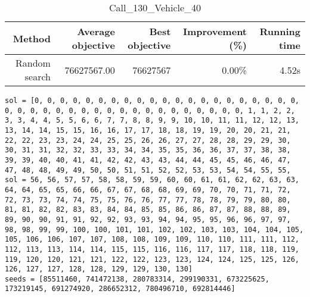 \begin{table}[ht]
\centering
\caption{Call\_130\_Vehicle\_40}
\label{tab:call130vehicle40}
\begin{tabular}{|r|r|r|r|r|}
Method & Average objective & Best objective & Improvement (\%) & Running time \\
\hline
Random search & 76627567.00 & 76627567 & 0.00\% & 4.52s\\
\end{tabular}
\end{table}
\begin{lstlisting}[label={lst:call130vehicle40},caption=Optimal solution call\_130\_vehicle\_40]
sol = [0, 0, 0, 0, 0, 0, 0, 0, 0, 0, 0, 0, 0, 0, 0, 0, 0, 0, 0, 0, 0, 0, 0, 0, 0, 0, 0, 0, 0, 0, 0, 0, 0, 0, 0, 0, 0, 0, 0, 0, 1, 1, 2, 2, 3, 3, 4, 4, 5, 5, 6, 6, 7, 7, 8, 8, 9, 9, 10, 10, 11, 11, 12, 12, 13, 13, 14, 14, 15, 15, 16, 16, 17, 17, 18, 18, 19, 19, 20, 20, 21, 21, 22, 22, 23, 23, 24, 24, 25, 25, 26, 26, 27, 27, 28, 28, 29, 29, 30, 30, 31, 31, 32, 32, 33, 33, 34, 34, 35, 35, 36, 36, 37, 37, 38, 38, 39, 39, 40, 40, 41, 41, 42, 42, 43, 43, 44, 44, 45, 45, 46, 46, 47, 47, 48, 48, 49, 49, 50, 50, 51, 51, 52, 52, 53, 53, 54, 54, 55, 55,
sol = 56, 56, 57, 57, 58, 58, 59, 59, 60, 60, 61, 61, 62, 62, 63, 63, 64, 64, 65, 65, 66, 66, 67, 67, 68, 68, 69, 69, 70, 70, 71, 71, 72, 72, 73, 73, 74, 74, 75, 75, 76, 76, 77, 77, 78, 78, 79, 79, 80, 80, 81, 81, 82, 82, 83, 83, 84, 84, 85, 85, 86, 86, 87, 87, 88, 88, 89, 89, 90, 90, 91, 91, 92, 92, 93, 93, 94, 94, 95, 95, 96, 96, 97, 97, 98, 98, 99, 99, 100, 100, 101, 101, 102, 102, 103, 103, 104, 104, 105, 105, 106, 106, 107, 107, 108, 108, 109, 109, 110, 110, 111, 111, 112, 112, 113, 113, 114, 114, 115, 115, 116, 116, 117, 117, 118, 118, 119, 119, 120, 120, 121, 121, 122, 122, 123, 123, 124, 124, 125, 125, 126, 126, 127, 127, 128, 128, 129, 129, 130, 130]
seeds = [85511460, 741472138, 280783314, 299190331, 673225625, 173219145, 691274920, 286652312, 780496710, 692814446]
\end{lstlisting}
\clearpage


